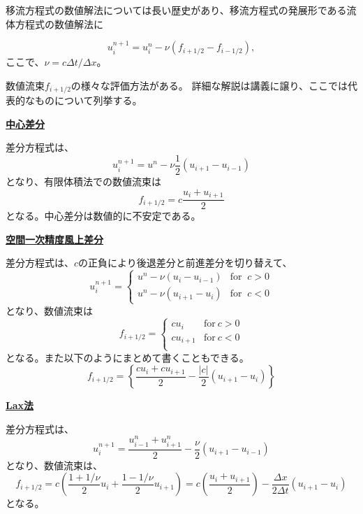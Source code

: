移流方程式の数値解法については長い歴史があり、移流方程式の発展形である流体方程式の数値解法に


\begin{equation}
u_i^{n+1} = u_i^n - \nu (f_{i+1/2} - f_{i-1/2}),
\end{equation}
ここで、$\nu = c \Delta t/\Delta x$。

数値流束$f_{i+1/2}$の様々な評価方法がある。
詳細な解説は講義に譲り、ここでは代表的なものについて列挙する。

\noindent
\underline{\bf 中心差分}

差分方程式は、
\begin{equation}
    u_i^{n+1} = u^n - \nu \frac{1}{2} \left( u_{i+1} - u_{i-1}\right)
\end{equation}
となり、有限体積法での数値流束は
\begin{equation}
    f_{i+1/2} = 
    c \frac{u_i+u_{i+1}}{2}
\end{equation}
となる。中心差分は数値的に不安定である。

\noindent
\underline{\bf 空間一次精度風上差分}

差分方程式は、$c$の正負により後退差分と前進差分を切り替えて、
\begin{equation}
    u_i^{n+1} = 
    \left\{
    \begin{array}{ll}
    u^n - \nu \left( u_{i} - u_{i-1}\right) & \mathrm{for}\;\; c>0 \\
    u^n - \nu \left( u_{i+1} - u_{i}\right) & \mathrm{for}\;\; c<0
    \end{array}
    \right.
\end{equation}
となり、数値流束は
\begin{equation}
    f_{i+1/2} = 
    \left\{
    \begin{array}{ll}
         c u_i & \mathrm{for}~ c> 0 \\
         c u_{i+1} & \mathrm{for}~ c<0 \\
    \end{array}
    \right.
\end{equation}
となる。また以下のようにまとめて書くこともできる。
\begin{equation}
    f_{i+1/2} = 
    \left\{
    \frac{cu_i+cu_{i+1}}{2}
     - \frac{|c|}{2}(u_{i+1} - u_i) 
    \right\}
\end{equation}

\noindent
\underline{\bf Lax法}

差分方程式\citep{Lax1954}は、
\begin{equation}
    u_i^{n+1} = \frac{u_{i-1}^n + u_{i+1}^n}{2} - \frac{\nu}{2} \left( u_{i+1} - u_{i-1}\right)
\end{equation}
となり、数値流束は、
\begin{equation}
    f_{i+1/2} = 
    c\left(
    \frac{1+1/\nu}{2} u_{i}
    + \frac{1-1/\nu}{2} u_{i+1}
    \right)
    = 
    c\left(
    \frac{u_i+u_{i+1}}{2}
    \right)
     - \frac{\Delta x}{2\Delta t}(u_{i+1} - u_i) 
\end{equation}
となる。

